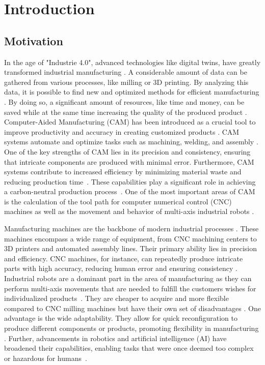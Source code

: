 \chapter{Introduction}%
\section{Motivation}%

In the age of "Industrie 4.0", advanced technologies like digital twins, have greatly transformed industrial manufacturing \cite{Singh.2021}. A considerable amount of data can be gathered from various processes, like milling or 3D printing. By analyzing this data, it is possible to find new and optimized methods for efficient manufacturing \cite{Ghobakhloo.2020}. By doing so, a significant amount of resources, like time and money, can be saved while at the same time increasing the quality of the produced product \cite{Bibby.2018,Simonis.2016}.\newline
Computer-Aided Manufacturing (CAM) has been introduced as a crucial tool to improve productivity and accuracy in creating customized products \cite{Feldhausen.2022}. CAM systems automate and optimize tasks such as machining, welding, and assembly \cite{LalitNarayan.2013b}. One of the key strengths of CAM lies in its precision and consistency, ensuring that intricate components are produced with minimal error. Furthermore, CAM systems contribute to increased efficiency by minimizing material waste and reducing production time~\cite{Dubovska.2014}. These capabilities play a significant role in achieving a carbon-neutral production process~\cite{Saxena.2020}. One of the most important areas of CAM is the calculation of the tool path for computer numerical control (CNC) machines as well as the movement and behavior of multi-axis industrial robots \cite{Pan}. \newline


Manufacturing machines are the backbone of modern industrial processes \cite{Bi.2020}. These machines encompass a wide range of equipment, from CNC machining centers to 3D printers and automated assembly lines. Their primary ability lies in precision and efficiency. CNC machines, for instance, can repeatedly produce intricate parts with high accuracy, reducing human error and ensuring consistency \cite{Jia.2018}. \newline
Industrial robots are a dominant part in the area of manufacturing as they can perform multi-axis movements that are needed to fulfill the customers wishes for individualized products~\cite{Sherwani.2020}. They are cheaper to acquire and more flexible compared to CNC milling machines but have their own set of disadvantages \cite{Iglesias.2015}. One advantage is the wide adaptability. They allow for quick reconfiguration to produce different components or products, promoting flexibility in manufacturing \cite{Billard.2019}. Further, advancements in robotics and artificial intelligence (AI) have broadened their capabilities, enabling tasks that were once deemed too complex or hazardous for humans~\cite{Goel.2020}. \newline

